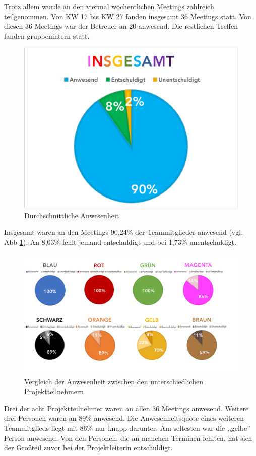 \documentclass[../review_3.tex]{subfiles}
\begin{document}
Trotz allem wurde an den viermal wöchentlichen Meetings zahlreich teilgenommen. Von KW 17 bis KW 27 fanden insgesamt 36 Meetings statt. Von diesen 36 Meetings war der Betreuer an 20 anwesend. Die restlichen Treffen fanden gruppenintern statt.

\begin{figure} [h]
    \centering
    \includegraphics[width = 0.5\linewidth]{img/insgesamt.pdf}
    \caption{Durchschnittliche Anwesenheit}
    \label{ins}
\end{figure}

Insgesamt waren an den Meetings 90,24\% der Teammitglieder anwesend (vgl. Abb \ref{ins}). An 8,03\% fehlt jemand entschuldigt und bei 1,73\% unentschuldigt.

\begin{figure} [H]
    \centering
    \includegraphics[width = \linewidth]{img/meetingsstatstik.pdf}
    \caption{Vergleich der Anwesenheit zwischen den unterschiedlichen Projektteilnehmern}
    \label{stat}
\end{figure}

Drei der acht Projektteilnehmer waren an allen 36 Meetings anwesend. Weitere drei Personen waren an 89\% anwesend. Die Anwesenheitsquote eines weiteren Teammitglieds liegt mit 86\% nur knapp darunter. Am seltesten war die ,,gelbe'' Person anwesend. Von den Personen, die an manchen Terminen fehlten, hat sich der Großteil zuvor bei der Projektleiterin entschuldigt.
\end{document}
